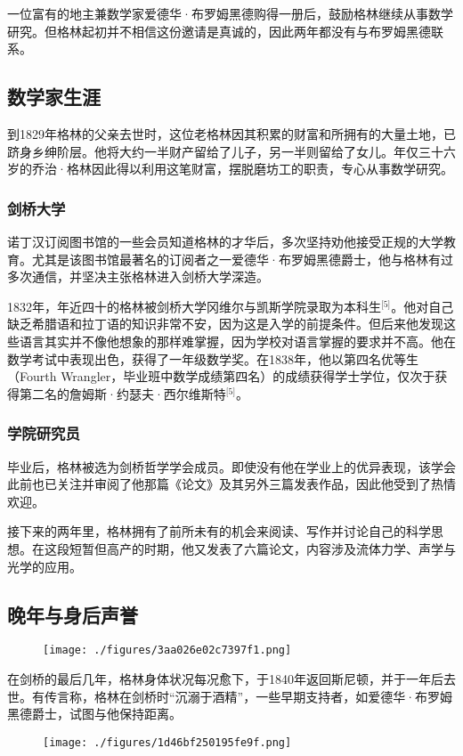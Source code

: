 一位富有的地主兼数学家爱德华·布罗姆黑德购得一册后，鼓励格林继续从事数学研究。但格林起初并不相信这份邀请是真诚的，因此两年都没有与布罗姆黑德联系。
\subsection{数学家生涯}
到1829年格林的父亲去世时，这位老格林因其积累的财富和所拥有的大量土地，已跻身乡绅阶层。他将大约一半财产留给了儿子，另一半则留给了女儿。年仅三十六岁的乔治·格林因此得以利用这笔财富，摆脱磨坊工的职责，专心从事数学研究。
\subsubsection{剑桥大学}
诺丁汉订阅图书馆的一些会员知道格林的才华后，多次坚持劝他接受正规的大学教育。尤其是该图书馆最著名的订阅者之一爱德华·布罗姆黑德爵士，他与格林有过多次通信，并坚决主张格林进入剑桥大学深造。

1832年，年近四十的格林被剑桥大学冈维尔与凯斯学院录取为本科生\(^\text{[5]}\)。他对自己缺乏希腊语和拉丁语的知识非常不安，因为这是入学的前提条件。但后来他发现这些语言其实并不像他想象的那样难掌握，因为学校对语言掌握的要求并不高。他在数学考试中表现出色，获得了一年级数学奖。在1838年，他以第四名优等生（Fourth Wrangler，毕业班中数学成绩第四名）的成绩获得学士学位，仅次于获得第二名的詹姆斯·约瑟夫·西尔维斯特\(^\text{[5]}\)。
\subsubsection{学院研究员}
毕业后，格林被选为剑桥哲学学会成员。即使没有他在学业上的优异表现，该学会此前也已关注并审阅了他那篇《论文》及其另外三篇发表作品，因此他受到了热情欢迎。

接下来的两年里，格林拥有了前所未有的机会来阅读、写作并讨论自己的科学思想。在这段短暂但高产的时期，他又发表了六篇论文，内容涉及流体力学、声学与光学的应用。
\subsection{晚年与身后声誉}
\begin{figure}[ht]
\centering
\texttt{[image: ./figures/3aa026e02c7397f1.png]}
\caption{} \label{fig_QZgl_3}
\end{figure}
在剑桥的最后几年，格林身体状况每况愈下，于1840年返回斯尼顿，并于一年后去世。有传言称，格林在剑桥时“沉溺于酒精”，一些早期支持者，如爱德华·布罗姆黑德爵士，试图与他保持距离。
\begin{figure}[ht]
\centering
\texttt{[image: ./figures/1d46bf250195fe9f.png]}
\caption{} \label{fig_QZgl_4}
\end{figure}
